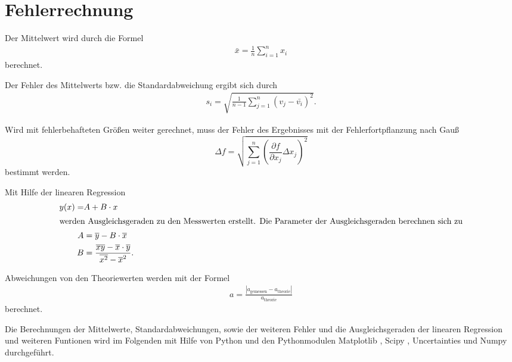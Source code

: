 \section{Fehlerrechnung}
\label{sec:Fehlerrechnung}

Der Mittelwert wird durch die Formel
\begin{align*}
    \bar{x}=\frac{1}{n} \sum_{i=1}^n x_i \label{eqn:Mittelwert}
\end{align*}
berechnet.

Der Fehler des Mittelwerts bzw. die Standardabweichung ergibt sich durch
\begin{align*}
    s_i=\sqrt{\frac{1}{n-1}\sum_{j=1}^n (v_j-\bar{v_i})^2}.
\end{align*}

Wird mit fehlerbehafteten Größen weiter gerechnet, muss der Fehler des Ergebnisses mit der Fehlerfortpflanzung nach Gauß
\begin{equation*}
    \Delta f=\sqrt{\sum_{j=1}^n \left(\frac{\partial f}{\partial x_j}\Delta x_j \right)^{2} }\label{eqn:Gauß}
\end{equation*}
bestimmt werden.

Mit Hilfe der linearen Regression 
\begin{subequations}
    \label{eqn:lin}
\begin{align}
    y(x)=&A+B\cdot x\\
    \intertext{werden Ausgleichsgeraden zu den Messwerten erstellt. Die Parameter der Ausgleichsgeraden berechnen sich zu}
    A&=\overline{y}-B\cdot \overline{x}\label{eqn:lina}\\
    B&=\frac{\overline{xy}-\overline{x}\cdot \overline{y}}{\overline{x^2}-\overline{x}^2}\label{eqn:linb}.
\end{align}
\end{subequations}

Abweichungen von den Theoriewerten werden mit der Formel
\begin{align}
  a=\frac{|a_\mathrm{gemessen}-a_\mathrm{theorie}|}{a_\mathrm{theorie}} \label{eqn:abweich}
\end{align}
berechnet.

Die Berechnungen der Mittelwerte, Standardabweichungen, sowie der weiteren Fehler und die Ausgleichsgeraden der linearen Regression und weiteren Funtionen
wird im Folgenden mit Hilfe von Python und den Pythonmodulen Matplotlib \cite{matplotlib}, Scipy \cite{scipy}, Uncertainties \cite{uncertainties} und Numpy \cite{numpy}
durchgeführt.